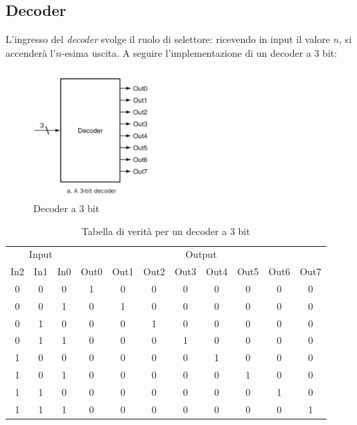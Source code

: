 \documentclass[class=book, crop=false]{standalone}
\begin{document}
\subsection{Decoder}
L'ingresso del \emph{decoder} svolge il ruolo di selettore: ricevendo in input il valore \(n\), si accenderà l'\(n\)-esima uscita. A seguire l'implementazione di un decoder a 3 bit:
\begin{figure}[H]
	\centering
	\includegraphics[width=0.4\textwidth,keepaspectratio]{3bit_decoder.png}
	\caption{Decoder a 3 bit}
\end{figure}
\begin{table}[!h]
	\centering
	\begin{tabular}{ccc|cccccccc}
		\multicolumn{3}{c|}{Input} & \multicolumn{8}{c}{Output} \\
		In2 & In1 & In0 & Out0 & Out1 & Out2 & Out3 & Out4 & Out5 & Out6 & Out7 \\ \hline
		0 & 0 & 0 & 1 & 0 & 0 & 0 & 0 & 0 & 0 & 0 \\
		0 & 0 & 1 & 0 & 1 & 0 & 0 & 0 & 0 & 0 & 0 \\
		0 & 1 & 0 & 0 & 0 & 1 & 0 & 0 & 0 & 0 & 0 \\
		0 & 1 & 1 & 0 & 0 & 0 & 1 & 0 & 0 & 0 & 0 \\
		1 & 0 & 0 & 0 & 0 & 0 & 0 & 1 & 0 & 0 & 0 \\
		1 & 0 & 1 & 0 & 0 & 0 & 0 & 0 & 1 & 0 & 0 \\
		1 & 1 & 0 & 0 & 0 & 0 & 0 & 0 & 0 & 1 & 0 \\
		1 & 1 & 1 & 0 & 0 & 0 & 0 & 0 & 0 & 0 & 1 \\
	\end{tabular}
	\caption{Tabella di verità per un decoder a 3 bit}
	\label{decoder-3bit}
\end{table}
\end{document}
